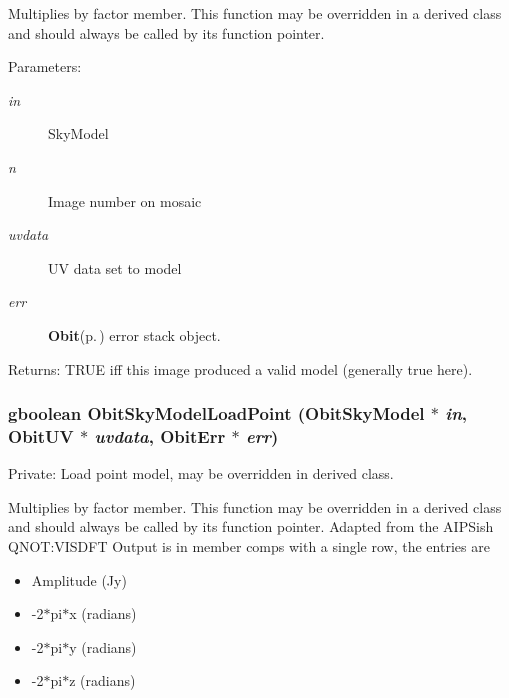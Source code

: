 Multiplies by factor member. This function may be overridden in a derived class and should always be called by its function pointer. \begin{Desc}
\item[Parameters:]
\begin{description}
\item[{\em in}]Sky\-Model \item[{\em n}]Image number on mosaic \item[{\em uvdata}]UV data set to model \item[{\em err}]{\bf Obit}{\rm (p.\,\pageref{structObit})} error stack object. \end{description}
\end{Desc}
\begin{Desc}
\item[Returns:]TRUE iff this image produced a valid model (generally true here). \end{Desc}
\subsubsection{\setlength{\rightskip}{0pt plus 5cm}gboolean Obit\-Sky\-Model\-Load\-Point ({\bf Obit\-Sky\-Model} $\ast$ {\em in}, {\bf Obit\-UV} $\ast$ {\em uvdata}, {\bf Obit\-Err} $\ast$ {\em err})}\label{ObitSkyModel_8c_a9}


Private: Load point model, may be overridden in derived class. 

Multiplies by factor member. This function may be overridden in a derived class and should always be called by its function pointer. Adapted from the AIPSish QNOT:VISDFT Output is in member comps with a single row, the entries are \begin{itemize}
\item Amplitude (Jy) \item -2$\ast$pi$\ast$x (radians) \item -2$\ast$pi$\ast$y (radians) \item -2$\ast$pi$\ast$z (radians) 
\end{itemize}
